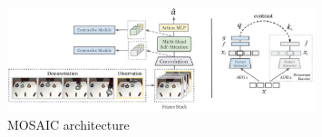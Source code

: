 \begin{figure}[htb]
    \centering
    \includegraphics[width=0.8\textwidth]{Figures/images/mosaic/mosaic.jpg}
    \caption{MOSAIC architecture \cite{mandi2022towards_more_generalizable_one_shot}}
    \label{fig:mosaic}
\end{figure}
